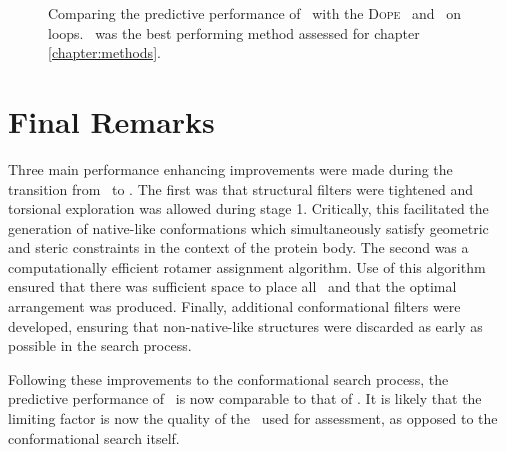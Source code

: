\begin{figure}[p]
\begin{center}
\end{center}
\caption[Comparing the predictive performance of \modloop\ and \arcus\ on  loops.]{Comparing the predictive performance of \modloop\ with the \textsc{Dope} \forcefield\ and \arcus\ on  loops. \modloop\ was the best performing method assessed for chapter \ref{chapter:methods}.}
\label{figure:arcus:compModloopArcus}
\end{figure}


\section{Final Remarks}

Three main performance enhancing improvements were made during the transition from \prearcus\ to \arcus. The first was that structural filters were tightened and torsional exploration was allowed during stage 1. Critically, this facilitated the generation of native-like conformations which simultaneously satisfy geometric and steric constraints in the context of the protein body.
The second was a computationally efficient rotamer assignment algorithm. Use of this algorithm ensured that there was sufficient space to place all \sidechains\ and that the optimal arrangement was produced. Finally, additional conformational filters were developed, ensuring that non-native-like structures were discarded as early as possible in the search process.


Following these improvements to the conformational search process, the predictive performance of \arcus\ is now comparable to that of \modloop. It is likely that the limiting factor is now the quality of the \forcefield\ used for assessment, as opposed to the conformational search itself.



